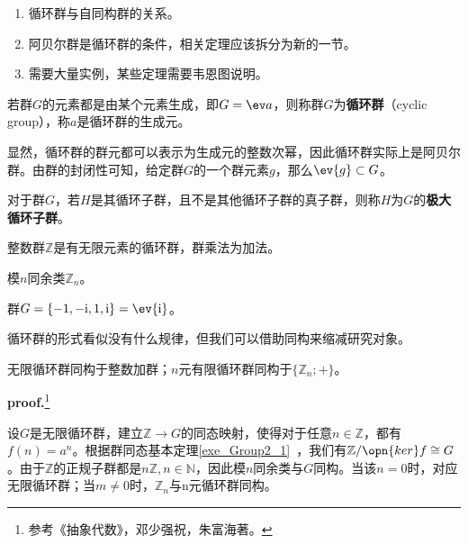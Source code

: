 
\begin{issues}
\issueTODO 
\begin{enumerate}
\item 循环群与自同构群的关系。
\item 阿贝尔群是循环群的条件，相关定理应该拆分为新的一节。
\item 需要大量实例，某些定理需要韦恩图说明。
\end{enumerate}
\end{issues}

\begin{definition}{}
若群$G$的元素都是由某个元素生成，即$G=\ev  a$，则称群$G$为\textbf{循环群}（cyclic group），称$a$是循环群的生成元。
\end{definition}
显然，循环群的群元都可以表示为生成元的整数次幂，因此循环群实际上是阿贝尔群。由群的封闭性可知，给定群$G$的一个群元素$g$，那么$\ev{g}\subset G$。
\begin{definition}{}
对于群$G$，若$H$是其循环子群，且不是其他循环子群的真子群，则称$H$为$G$的\textbf{极大循环子群}。
\end{definition}

\begin{example}{}
整数群$\mathbb Z$是有无限元素的循环群，群乘法为加法。
\end{example}
\begin{example}{}
模$n$同余类$\mathbb Z_n$。
\end{example}
\begin{example}{}
群$G=\{-1,-\mathrm i,1,\mathrm i\}=\ev {\mathrm i}$。
\end{example}
循环群的形式看似没有什么规律，但我们可以借助同构来缩减研究对象。
\begin{theorem}{}\label{the_cyclic_3}
无限循环群同构于整数加群；$n$元有限循环群同构于$\{\mathbb Z_n;+\}$。
\end{theorem}
\textbf{proof.}\footnote{参考《抽象代数》，邓少强祝，朱富海著。}

设$G$是无限循环群，建立$\mathbb Z\rightarrow G$的同态映射，使得对于任意$n\in \mathbb Z$，都有$f(n)=a^n$。根据群同态基本定理\autoref{exe_Group2_1}~，我们有$\mathbb Z/\opn{ker}f\cong G$。由于$\mathbb Z$的正规子群都是$n\mathbb Z,n\in \mathbb N$，因此模$n$同余类与$G$同构。当该$n=0$时，对应无限循环群；当$m\neq 0$时，$\mathbb Z_n$与n元循环群同构。

